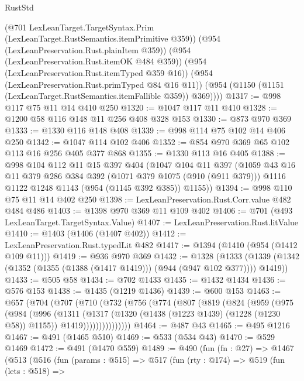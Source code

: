 \begin{lexlean}{RustStd}
\begin{coremodule}
        (@701 LexLeanTarget.TargetSyntax.Prim (LexLeanTarget.RustSemantics.itemPrimitive @359))
        (@954 (LexLeanPreservation.Rust.plainItem @359))
        (@954 (LexLeanPreservation.Rust.itemOK @484 @359))
        (@954 (LexLeanPreservation.Rust.itemTyped @359 @16))
        (@954 (LexLeanPreservation.Rust.primTyped @84 @16 @11))
        (@954 (@1150 (@1151 (LexLeanTarget.RustSemantics.itemFallible @359)) @369))))
@1317 := @998 @117 @75 @11 @14 @410 @250
@1320 := @1047 @117 @11 @410
@1328 := @1200 @58 @116 @148 @11 @256 @408 @328 @153
@1330 := @873 @970 @369
@1333 := @1330 @116 @148 @408
@1339 := @998 @114 @75 @102 @14 @406 @250
@1342 := @1047 @114 @102 @406
@1352 := @854 @970 @369 @65 @102 @113 @16 @256 @405 @377 @868
@1355 := @1330 @113 @16 @405
@1388 := @998
    @104
    @112
    @11
    @15
    @397
    @404
    (@1047
      @104
      @11
      @397
      (@1059
        @43
        @16
        @11
        @379
        @286
        @384
        @392
        (@1071 @379 @1075 (@910 (@911 @379)))
        @1116
        @1122
        @1248
        @1143
        (@954 (@1145 @392 @385))
        @1155))
@1394 := @998 @110 @75 @11 @14 @402 @250
@1398 := LexLeanPreservation.Rust.Corr.value @482 @484 @486
@1403 := @1398 @970 @369 @11 @109 @402
@1406 := @701 (@493 LexLeanTarget.TargetSyntax.Value)
@1407 := LexLeanPreservation.Rust.litValue
@1410 := @1403 (@1406 (@1407 @402))
@1412 := LexLeanPreservation.Rust.typedLit @482
@1417 := @1394 (@1410 (@954 (@1412 @109 @11)))
@1419 := @936 @970 @369
@1432 := @1328
    (@1333 (@1339 (@1342 (@1352 (@1355 (@1388 (@1417 @1419))) (@944 (@947 @102 @377)))) @1419))
@1433 := @505 @58
@1434 := @702 @1433
@1435 := @1432 @1434
@1436 := @576 @153
@1438 := @1435 (@1219 @1436)
@1439 := @600 @153
@1463 := @657
    (@704
      (@707
        (@710
          (@732
            (@756
              (@774
                (@807
                  (@819
                    (@824
                      (@959
                        (@975
                          (@984
                            (@996
                              (@1311
                                (@1317
                                  (@1320 (@1438 (@1223 @1439) (@1228 (@1230 @58)) @1155))
                                  @1419)))))))))))))))
@1464 := @487 @43
@1465 := @495 @1216
@1467 := @491 (@1465 @510)
@1469 := @533 (@534 @43)
@1470 := @529 @1469
@1472 := @491 (@1470 @559)
@1489 := @490
    (fun (fn : @27) =>
    @1467
      (@513
        (@516
          (fun (params : @515) =>
          @517
            (fun (rty : @174) =>
            @519
              (fun (lets : @518) =>

\end{coremodule}
\end{lexlean}
